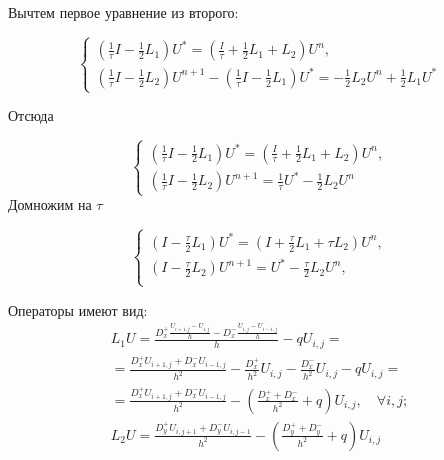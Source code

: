 \documentclass[a4paper,12pt]{article}
\begin{document}
Вычтем первое уравнение из второго:

\begin{equation}
  \begin{cases}
    \left( \frac{1}{\tau} I - \frac{1}{2} L_1 \right) U^* = \left( \frac{I}{\tau} + \frac{1}{2} L_1 + L_2 \right) U^n, \\
    \left( \frac{1}{\tau} I - \frac{1}{2} L_2 \right) U^{n+1} - \left( \frac{1}{\tau} I - \frac{1}{2} L_1 \right) U^* = - \frac{1}{2} L_2 U^n + \frac{1}{2} L_1 U^*
  \end{cases}
\end{equation}

Отсюда

\begin{equation}
  \begin{cases}
    \left( \frac{1}{\tau} I - \frac{1}{2} L_1 \right) U^* = \left( \frac{I}{\tau} + \frac{1}{2} L_1 + L_2 \right) U^n, \\
    \left( \frac{1}{\tau} I - \frac{1}{2} L_2 \right) U^{n+1} = \frac{1}{\tau} U^* - \frac{1}{2} L_2 U^n
  \end{cases}
\end{equation}
Домножим на $\tau$

\begin{equation}
  \label{eq:Douglas-Gunn-2d}
  \begin{cases}
    \left( I - \frac{\tau}{2} L_1 \right) U^* = \left( I + \frac{\tau}{2} L_1 + \tau L_2 \right) U^n, \\
    \left( I - \frac{\tau}{2} L_2 \right) U^{n+1} = U^* - \frac{\tau}{2} L_2 U^n, \\
  \end{cases}
\end{equation}

Операторы имеют вид:
\begin{equation}
  \begin{aligned}
    L_1 U = \frac{D^+_x \frac{U_{i+1,j} - U_{i,j}}{h} - D^-_x\frac{U_{i,j} - U_{i-1,j}}{h}}{h}  - qU_{i,j} = \\
    = \frac{D^+_x U_{i+1,j} + D^-_x U_{i-1,j}}{h^2} - \frac{D^+_x}{h^2}U_{i,j} - \frac{D^-_x}{h^2} U_{i,j} - q U_{i,j} = \\
    = \frac{D^+_x U_{i+1,j} + D^-_x U_{i-1,j}}{h^2} - \left(\frac{D^+_x + D^-_x}{h^2} + q \right) U_{i,j}, \quad \forall i,j; \\
    L_2 U = \frac{D^+_y U_{i,j+1} + D^-_y U_{i,j-1}}{h^2} - \left(\frac{D^+_y + D^-_y}{h^2} + q \right) U_{i,j}
  \end{aligned}
\end{equation}
\end{document}
